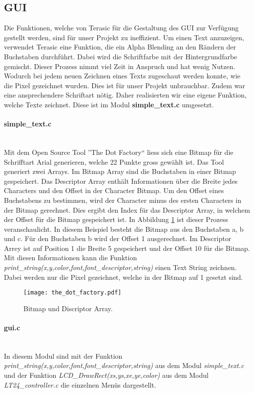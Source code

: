 \subsection{GUI}\label{subsec:gui}
Die Funktionen, welche von Terasic für die Gestaltung des GUI zur Verfügung gestellt werden, sind für unser Projekt zu ineffizient. Um einen Text anzuzeigen, verwendet Terasic eine Funktion, die ein Alpha Blending an den Rändern der Buchstaben durchführt. Dabei wird die Schriftfarbe mit der Hintergrundfarbe gemischt. Dieser Prozess nimmt viel Zeit in Anspruch und hat wenig Nutzen. Wodurch bei jedem neuen Zeichnen eines Texts zugeschaut werden konnte, wie die Pixel gezeichnet wurden. Dies ist für unser Projekt unbrauchbar. Zudem war eine ansprechendere Schriftart nötig. Daher realisierten wir eine eigene Funktion, welche Texte zeichnet. Diese ist im Modul \textbf{simple\_text.c} umgesetzt.

\paragraph{simple\_text.c}\mbox{}\\

Mit dem Open Source Tool ''The Dot Factory`` liess sich eine Bitmap für die Schrifftart Arial generieren, welche 22 Punkte gross gewählt ist. Das Tool generiert zwei Arrays. Im Bitmap Array sind die Buchstaben in einer Bitmap gespeichert. Das Descriptor Array enthält Informationen über die Breite jedes Characters und den Offset in der Character Bitmap. Um den Offset eines Buchstabens zu bestimmen, wird der Character minus des ersten Characters in der Bitmap gerechnet. Dies ergibt den Index für das Descriptor Array, in welchem der Offset für die Bitmap gespeichert ist. In Abbildung \ref{img:bitmap} ist dieser Prozess veranschaulicht. In diesem Beispiel besteht die Bitmap aus den Buchstaben a, b und c. Für den Buchstaben b wird der Offset 1 ausgerechnet. Im Descriptor Arrey ist auf Position 1 die Breite 5 gespeichert und der Offset 10 für die Bitmap. Mit diesen Informationen kann die Funktion \textit{print\_string(x,y,color,font,font\_descriptor,string)} einen Text String zeichnen. Dabei werden nur die Pixel gezeichnet, welche in der Bitmap auf 1 gesetzt sind.

\begin{figure}[h]
	\centering
	\texttt{[image: the\_dot\_factory.pdf]}
	\caption{Bitmap und Discriptor Array.}
	\label{img:bitmap}
\end{figure}

\paragraph{gui.c} \mbox{}\\

In diesem Modul sind mit der Funktion \textit{print\_string(x,y,color,font,font\_descriptor,string)} aus dem Modul  \textit{simple\_text.c} und der Funktion \textit{LCD\_DrawRect(xs,ys,xe,ye,color)} aus dem Modul \textit{LT24\_controller.c} die einzelnen Menüs dargestellt. 